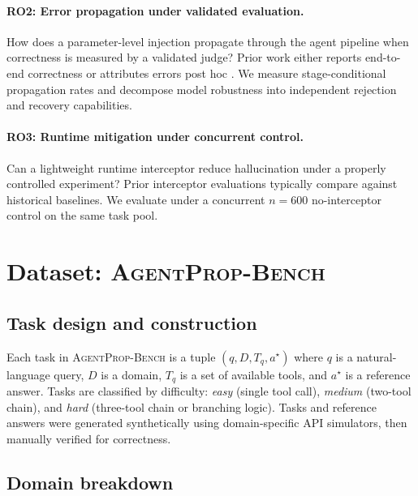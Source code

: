 \documentclass{ieeeaccess}
\newcommand{\bench}{\textsc{AgentProp-Bench}\xspace}
\begin{document}
\paragraph{RO2: Error propagation under validated evaluation.}
How does a parameter-level injection propagate through the agent
pipeline when correctness is measured by a validated judge?
Prior work either reports end-to-end correctness or attributes
errors post hoc \cite{liu2026agenthallu}.
We measure stage-conditional propagation rates and decompose model
robustness into independent rejection and recovery capabilities.

\paragraph{RO3: Runtime mitigation under concurrent control.}
Can a lightweight runtime interceptor reduce hallucination under a
properly controlled experiment?
Prior interceptor evaluations \cite{wang2026agentspec} typically
compare against historical baselines.
We evaluate under a concurrent $n{=}600$ no-interceptor control on
the same task pool.


\section{Dataset: \bench{}}
\label{sec:dataset}

\subsection{Task design and construction}

Each task in \bench{} is a tuple $(q, D, T_q, a^\star)$ where $q$ is a
natural-language query, $D$ is a domain, $T_q$ is a set of available
tools, and $a^\star$ is a reference answer.
Tasks are classified by difficulty: \emph{easy} (single tool call),
\emph{medium} (two-tool chain), and \emph{hard} (three-tool chain or
branching logic).
Tasks and reference answers were generated synthetically using
domain-specific API simulators, then manually verified for correctness.

\subsection{Domain breakdown}
\end{document}
